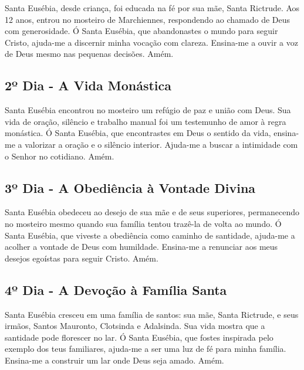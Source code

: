 \documentclass[a4paper,14pt]{extarticle} \usepackage[utf8]{inputenc}
\begin{document}
\underline{}

Santa Eusébia, desde criança, foi educada na fé por sua mãe, Santa Rictrude. Aos 12 anos, entrou no mosteiro de Marchiennes, respondendo ao chamado de Deus com generosidade.
Ó Santa Eusébia, que abandonastes o mundo para seguir Cristo, ajuda-me a discernir minha vocação com clareza. Ensina-me a ouvir a voz de Deus mesmo nas pequenas decisões. Amém.


\underline{}

\subsection{2º Dia - A Vida Monástica}

\underline{}

Santa Eusébia encontrou no mosteiro um refúgio de paz e união com Deus. Sua vida de oração, silêncio e trabalho manual foi um testemunho de amor à regra monástica.
Ó Santa Eusébia, que encontrastes em Deus o sentido da vida, ensina-me a valorizar a oração e o silêncio interior. Ajuda-me a buscar a intimidade com o Senhor no cotidiano. Amém.


\underline{}

\subsection{3º Dia - A Obediência à Vontade Divina}

\underline{}

Santa Eusébia obedeceu ao desejo de sua mãe e de seus superiores, permanecendo no mosteiro mesmo quando sua família tentou trazê-la de volta ao mundo.
Ó Santa Eusébia, que viveste a obediência como caminho de santidade, ajuda-me a acolher a vontade de Deus com humildade. Ensina-me a renunciar aos meus desejos egoístas para seguir Cristo. Amém.


\underline{}

\subsection{4º Dia - A Devoção à Família Santa}

\underline{}

Santa Eusébia cresceu em uma família de santos: sua mãe, Santa Rictrude, e seus irmãos, Santos Mauronto, Clotsinda e Adalsinda. Sua vida mostra que a santidade pode florescer no lar.
Ó Santa Eusébia, que fostes inspirada pelo exemplo dos teus familiares, ajuda-me a ser uma luz de fé para minha família. Ensina-me a construir um lar onde Deus seja amado. Amém.
\end{document}
